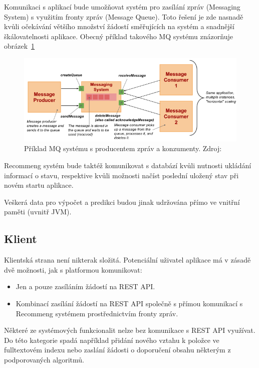 \documentclass[thesis=M,czech]{FITthesis}[2014/05/07]
\begin{document}
Komunikaci s aplikací bude umožňovat systém pro zasílání zpráv (Messaging System) s využitím fronty zpráv (Message Queue). Toto řešení je zde nasnadě kvůli očekávání většího množství žádostí směřujících na systém a snadnější škálovatelnosti aplikace. Obecný příklad takového MQ systému znázorňuje obrázek~\ref{fig:vitvarMq}

\begin{figure}\centering
	\includegraphics[width=1.2\textwidth]{obr/vitvar_mq.png}
 	\caption[Příklad MQ systému s producentem zpráv a konzumenty]{Příklad MQ systému s producentem zpráv a konzumenty. Zdroj: \cite{vitvarMq}}\label{fig:vitvarMq}
\end{figure}	

Recommeng systém bude taktéž komunikovat s databází kvůli nutnosti ukládání informací o stavu, respektive kvůli možnosti načíst poslední uložený stav při novém startu aplikace.

Veškerá data pro výpočet a predikci budou jinak udržována přímo ve vnitřní paměti (uvnitř JVM).

\subsection{Klient}

Klientská strana není nikterak složitá. Potenciální uživatel aplikace má v zásadě dvě možnosti, jak s platformou komunikovat:

\begin{itemize}
	\item Jen a pouze zasíláním žádostí na REST API.
	\item Kombinací zasílání žádostí na REST API společně s přímou komunikací s Recommeng systémem prostřednictvím fronty zpráv.
\end{itemize}

Některé ze systémových funkcionalit nelze bez komunikace s REST API využívat. Do této kategorie spadá například přidání nového vztahu k položce ve fulltextovém indexu nebo zaslání žádosti o doporučení obsahu některým z podporovaných algoritmů. 
\end{document}
